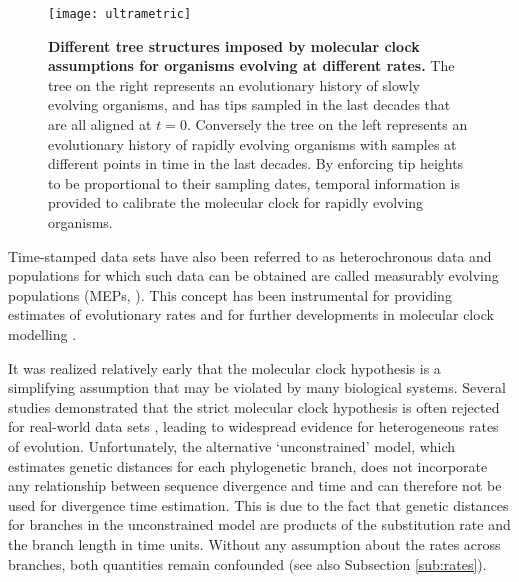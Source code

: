 \begin{figure}[h!]
\centering
\texttt{[image: ultrametric]} 
\caption{
{ \footnotesize 
{\bf Different tree structures imposed by molecular clock assumptions for organisms evolving at different rates.} 
The tree on the right represents an evolutionary history of slowly evolving organisms, and has tips sampled in the last decades that are all aligned at $t=0$. 
Conversely the tree on the left represents an evolutionary history of rapidly evolving organisms with samples at different points in time in the last decades. 
By enforcing tip heights to be proportional to their sampling dates, temporal information is provided to calibrate the molecular clock for rapidly evolving organisms.
}%
}
\label{fig:ultrametric}
\end{figure}

Time-stamped data sets have also been referred to as heterochronous data and %
populations for which such data can be obtained are called measurably evolving populations (MEPs, \cite{Drummond2003}).
This concept has been instrumental for providing estimates of evolutionary rates and for further developments in molecular clock modelling \citep{Drummond2006}.

It was realized relatively early that the molecular clock hypothesis is a simplifying assumption that may be violated by many biological systems.
Several studies demonstrated that the strict molecular clock hypothesis is often rejected for real-world data sets \citep{EyreWalker1997,Andreasen2001}, leading to widespread evidence for heterogeneous rates of evolution.
Unfortunately, the alternative `unconstrained' model, which estimates genetic distances for each phylogenetic branch, does not incorporate any relationship between sequence divergence and time and can therefore not be used for divergence time estimation.
This is due to the fact that genetic distances for branches in the unconstrained model are products of the substitution rate and the branch length in time units.
Without any assumption about the rates across branches, both quantities remain confounded (see also Subsection \ref{sub:rates}).

